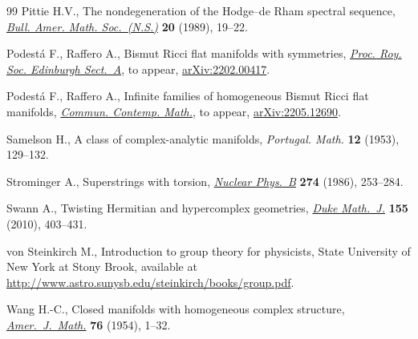 \documentclass[10pt,a4paper]{amsart}
\numberwithin{equation}{section}
\begin{document}
\begin{thebibliography}{99}
Pittie H.V., The nondegeneration of the {H}odge--de {R}ham spectral sequence,
 \href{https://doi.org/10.1090/S0273-0979-1989-15683-8}{\textit{Bull. Amer. Math. Soc.~(N.S.)}} \textbf{20} (1989), 19--22.

Podest\'a F., Raffero A., Bismut {R}icci flat manifolds with symmetries,
 \href{https://doi.org/10.1017/prm.2022.49}{\textit{Proc. Roy. Soc. Edinburgh Sect.~A}}, {t}o appear, \href{https://arxiv.org/abs/2202.00417}{arXiv:2202.00417}.

Podest\'a F., Raffero A., Infinite families of homogeneous {B}ismut {R}icci
 flat manifolds, \href{https://doi.org/10.1142/S0219199722500754}{\textit{Commun. Contemp. Math.}}, {t}o appear,
 \href{https://arxiv.org/abs/2205.12690}{arXiv:2205.12690}.

Samelson H., A class of complex-analytic manifolds, \textit{Portugal. Math.}
 \textbf{12} (1953), 129--132.

Strominger A., Superstrings with torsion, \href{https://doi.org/10.1016/0550-3213(86)90286-5}{\textit{Nuclear Phys.~B}} \textbf{274}
 (1986), 253--284.

Swann A., Twisting {H}ermitian and hypercomplex geometries, \href{https://doi.org/10.1215/00127094-2010-059}{\textit{Duke
 Math.~J.}} \textbf{155} (2010), 403--431.

von Steinkirch M., Introduction to group theory for physicists, {S}tate
 University of New York at Stony Brook, available at
 \url{http://www.astro.sunysb.edu/steinkirch/books/group.pdf}.

Wang H.-C., Closed manifolds with homogeneous complex structure,
 \href{https://doi.org/10.2307/2372397}{\textit{Amer.~J.~Math.}} \textbf{76} (1954), 1--32.

\end{thebibliography}
\end{document}
